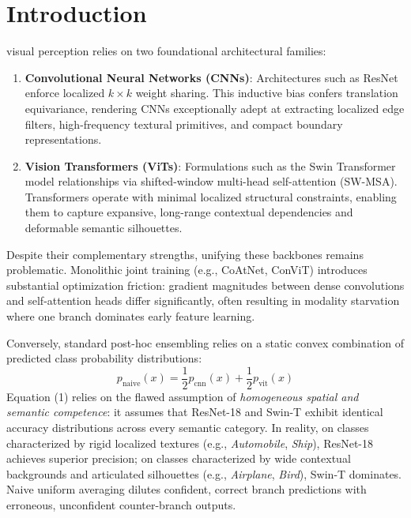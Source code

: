 \documentclass[10pt,journal,compsoc]{IEEEtran}
\begin{document}
\maketitle
\IEEEdisplaynontitleabstractindextext
\IEEEpeerreviewmaketitle

\section{Introduction}
 visual perception relies on two foundational architectural families:
\begin{enumerate}
    \item \textbf{Convolutional Neural Networks (CNNs)}: Architectures such as ResNet enforce localized $k \times k$ weight sharing. This inductive bias confers translation equivariance, rendering CNNs exceptionally adept at extracting localized edge filters, high-frequency textural primitives, and compact boundary representations.
    \item \textbf{Vision Transformers (ViTs)}: Formulations such as the Swin Transformer model relationships via shifted-window multi-head self-attention (SW-MSA). Transformers operate with minimal localized structural constraints, enabling them to capture expansive, long-range contextual dependencies and deformable semantic silhouettes.
\end{enumerate}

Despite their complementary strengths, unifying these backbones remains problematic. Monolithic joint training (e.g., CoAtNet, ConViT) introduces substantial optimization friction: gradient magnitudes between dense convolutions and self-attention heads differ significantly, often resulting in modality starvation where one branch dominates early feature learning. 

Conversely, standard post-hoc ensembling relies on a static convex combination of predicted class probability distributions:
\begin{equation}
p_{\text{naive}}(x) = \frac{1}{2} p_{\text{cnn}}(x) + \frac{1}{2} p_{\text{vit}}(x)
\end{equation}
Equation (1) relies on the flawed assumption of \textit{homogeneous spatial and semantic competence}: it assumes that ResNet-18 and Swin-T exhibit identical accuracy distributions across every semantic category. In reality, on classes characterized by rigid localized textures (e.g., \textit{Automobile}, \textit{Ship}), ResNet-18 achieves superior precision; on classes characterized by wide contextual backgrounds and articulated silhouettes (e.g., \textit{Airplane}, \textit{Bird}), Swin-T dominates. Naive uniform averaging dilutes confident, correct branch predictions with erroneous, unconfident counter-branch outputs.
\end{document}

